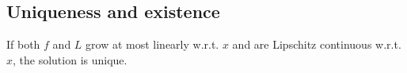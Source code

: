 \subsection{Uniqueness and existence}
If both $f$ and $L$ grow at most linearly w.r.t. $x$ and are Lipschitz continuous w.r.t. $x$, the solution is unique.